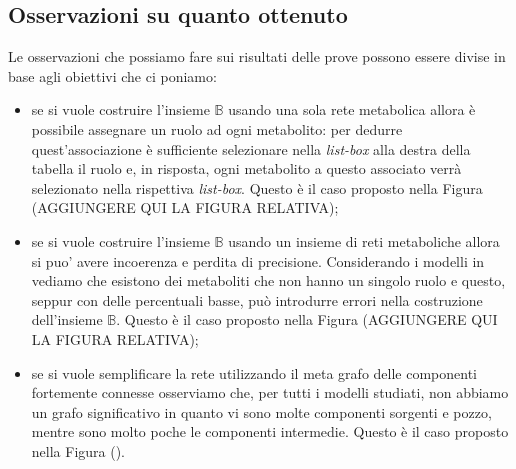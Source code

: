 \subsection{Osservazioni su quanto ottenuto}
Le osservazioni che possiamo fare sui risultati delle prove possono
essere divise in base agli obiettivi che ci poniamo:
\begin{itemize}
\item se si vuole costruire l'insieme $\mathbb{B}$ usando una sola
  rete metabolica allora \`e possibile assegnare un ruolo ad ogni
  metabolito: per dedurre quest'associazione \`e sufficiente
  selezionare nella \emph{list-box} alla destra della tabella il ruolo
  e, in risposta, ogni metabolito a questo associato verr\`a
  selezionato nella rispettiva \emph{list-box}. Questo \`e il caso
  proposto nella Figura (AGGIUNGERE QUI LA FIGURA RELATIVA);
\item se si vuole costruire l'insieme $\mathbb{B}$ usando un insieme
  di reti metaboliche allora si puo' avere incoerenza e perdita di
  precisione. Considerando i modelli in \cite{MetExplore} vediamo che
  esistono dei metaboliti che non hanno un singolo ruolo e questo,
  seppur con delle percentuali basse, pu\`o introdurre errori nella
  costruzione dell'insieme $\mathbb{B}$. Questo \`e il caso proposto
  nella Figura (AGGIUNGERE QUI LA FIGURA RELATIVA);
\item se si vuole semplificare la rete utilizzando il meta grafo delle
  componenti fortemente connesse osserviamo che, per tutti i modelli
  studiati, non abbiamo un grafo significativo in quanto vi sono molte
  componenti sorgenti e pozzo, mentre sono molto poche le componenti
  intermedie. Questo \`e il caso proposto nella Figura ().
\end{itemize}

